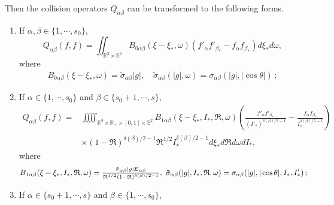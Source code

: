 \documentclass[reqno,11pt]{amsart}
\numberwithin{equation}{section}
\def\R{\mathbb{R}}
\begin{document}
Then the collision operators $Q_{\alpha \beta}$ can be transformed to the following forms.
\begin{enumerate}
    \item If $ \alpha ,\beta \in \{1,\cdots, s_0 \}$,
    \begin{equation} \label{eq2.14}
        Q_{\alpha \beta } (f,f) = \iint_{\R^3 \times \mathbb{S}^2 } B_{0\alpha \beta } (\xi-\xi_*,\omega )(f'_\alpha f'_{\beta_*}- f_\alpha f_{\beta_*})	d\xi_* d\omega , 
    \end{equation}
    where
    \begin{equation}\label{B0-ab}
        \begin{aligned}
            B_{0\alpha \beta } (\xi-\xi_*,\omega )=\tilde{\sigma}_{\alpha \beta }|g|,\quad \tilde{\sigma}_{\alpha \beta }(|g|,\omega)=\sigma_{\alpha \beta }(|g|,|\cos \theta|) \,;
        \end{aligned}
    \end{equation}
    \item If $\alpha \in \{1,\cdots, s_0 \}$ and $\beta \in \{s_0+1,\cdots,s \}$,
    \begin{equation}\label{eq2.15}
	\begin{aligned}
		 Q_{\alpha \beta } (f,f) =& \iiiint_{ \R^3 \times \R_+ \times [0,1] \times \mathbb{S}^2} B_{1\alpha \beta }(\xi-\xi_*,I_*, \mathfrak{R} ,\omega )(\tfrac{f'_\alpha f'_{\beta_*}}{(I'_* )^{\delta(\beta)/2-1}} - \tfrac{f_\alpha f_{\beta_*}}{ I_* ^{\delta(\beta)/2-1}}) \\
		& \times (1-\mathfrak{R})^{\delta(\beta )/2-1}  \mathfrak{R}^{1/2} I_*^{\delta(\beta)/2-1} d\xi_* d\mathfrak{R}d\omega dI_*, 
	\end{aligned}
    \end{equation}
    where
    \begin{equation}\label{B1-ab}{\small
        \begin{aligned}
            B_{1\alpha \beta }(\xi-\xi_*,I_*,\mathfrak{R},\omega )  = \tfrac{\tilde{\sigma}_{\alpha \beta }|g|E_{\alpha \beta }}{\mathfrak{R}^{1/2} (1-\mathfrak{R})^{\delta(\beta)/2-1}},\  \tilde{\sigma}_{\alpha \beta } (|g|,I_* ,\mathfrak{R},\omega )=\sigma_{\alpha \beta }(|g|,|\cos \theta|,I_*,I'_*) \,;
        \end{aligned}}
    \end{equation}
    \item If $\alpha \in \{s_0+1,\cdots,s \}$ and $\beta \in \{1,\cdots, s_0 \}$,
    \begin{equation}\label{eq2.16}
	\begin{aligned}

\end{aligned}
\end{equation}
\end{enumerate}
\end{document}
